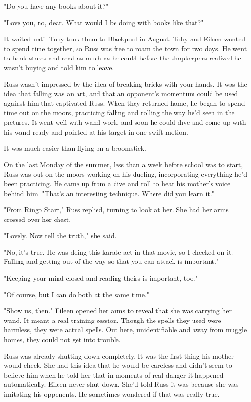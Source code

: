 "Do you have any books about it?"

"Love you, no, dear. What would I be doing with books like that?"

It waited until Toby took them to Blackpool in August. Toby and Eileen wanted to spend time together, so Russ was free to roam the town for two days. He went to book stores and read as much as he could before the shopkeepers realized he wasn't buying and told him to leave.

Russ wasn't impressed by the idea of breaking bricks with your hands. It was the idea that falling was an art, and that an opponent's momentum could be used against him that captivated Russ. When they returned home, he began to spend time out on the moors, practicing falling and rolling the way he'd seen in the pictures. It went well with wand work, and soon he could dive and come up with his wand ready and pointed at his target in one swift motion.

It was much easier than flying on a broomstick.

On the last Monday of the summer, less than a week before school was to start, Russ was out on the moors working on his dueling, incorporating everything he'd been practicing. He came up from a dive and roll to hear his mother's voice behind him. "That's an interesting technique. Where did you learn it."

"From Ringo Starr," Russ replied, turning to look at her. She had her arms crossed over her chest.

"Lovely. Now tell the truth," she said.

"No, it's true. He was doing this karate act in that movie, so I checked on it. Falling and getting out of the way so that you can attack is important."

"Keeping your mind closed and reading theirs is important, too."

"Of course, but I can do both at the same time."

"Show us, then." Eileen opened her arms to reveal that she was carrying her wand. It meant a real training session. Though the spells they used were harmless, they were actual spells. Out here, unidentifiable and away from muggle homes, they could not get into trouble.

Russ was already shutting down completely. It was the first thing his mother would check. She had this idea that he would be careless and didn't seem to believe him when he told her that in moments of real danger it happened automatically. Eileen never shut down. She'd told Russ it was because she was imitating his opponents. He sometimes wondered if that was really true.

